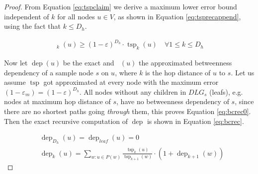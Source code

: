 \documentclass[11pt]{article}
\newcommand{\tsp}{\mathop{tsp}}
\newcommand{\tspapp}{\mathop{\overline{tsp}}}
\newcommand{\dep}{\mathop{dep}}
\newcommand{\depapp}{\mathop{\overline{dep}}}
\renewcommand{\epsilon}{\varepsilon}
\begin{document}
\begin{proof}
From Equation \eqref{eq:tspclaim} we derive a maximum lower error bound independent of $k$ for all nodes $u\in V$, as shown in Equation \eqref{eq:tsprecappend}, using the fact that $k\leq D_h$.

\begin{align}
\tspapp\nolimits_k(u)\geq(1-\epsilon)^{D_h}\cdot\tsp\nolimits_k(u)\quad\forall 1\leq k\leq D_h
\label{eq:tsprecappend}
\end{align}


Now let $\dep(u)$ be the exact and $\depapp(u)$ the approximated betweenness dependency of a sample node $s$ on $u$, where $k$ is the hop distance of $u$ to $s$. Let us assume $\tsp$ got approximated at every node with the maximum error $(1-\epsilon_m)=(1-\epsilon)^{D_h}$.
All nodes without any children in $DLG_s$ (leafs), e.g. nodes at maximum hop distance of $s$, have no betweenness dependency of $s$, since there are no shortest paths going \textit{through} them, this proves Equation \eqref{eq:bcrec0}.
Then the exact recursive computation of $\dep$ is shown in Equation \eqref{eq:bcrec}.

\begin{align}
&\dep\nolimits_{D_h}(u)=\dep\nolimits_{leaf}(u)=0 \label{eq:bcrec0}\\
&\dep\nolimits_k(u)=\sum_{w:u\in P(w)}\frac{\tsp\nolimits_{k}(u)}{\tsp\nolimits_{k+1}(w)}\cdot\left(1+\dep\nolimits_{k+1}(w)\right) \label{eq:bcrec}
\end{align}



\end{proof}
\end{document}
